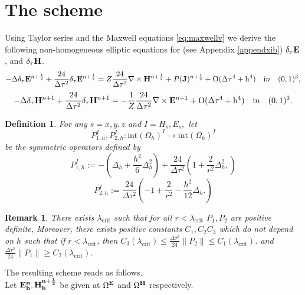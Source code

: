 \documentclass[12pt,reqno]{amsart}
\newcommand{\e}{{\bf E}}
\newcommand{\h}{{\bf H}}
\newcommand{\J}{{\bf J}}
\newtheorem{defi}[theorem]{Definition}
\newtheorem{rem}[theorem]{Remark}
\theoremstyle{definition}
\numberwithin{equation}{section}
\newcommand{\intr}[1]{\mathrm{int}(#1)}
\def\Gw{\Omega}     \def\Gx{\Xi}         \def\Gy{\Psi}
\def\Gwh{\Omega_h}
\begin{document}
	\section{The scheme}
	Using  Taylor series and the Maxwell equations \eqref{eq:maxwellv} we derive the following non-homogeneous elliptic equations for (see Appendix \ref{appendxib})
$	\delta_{\tau} \bf{E}$, and $\delta_{\tau} \bf{H}$.
	$$
	-\Delta\delta_{\tau} \e^{n+\frac{1}{2}}+\frac{24}{\Delta \tau^2}\delta_{\tau}\e^{n+\frac{1}{2}}=
	Z\frac{24}{\Delta \tau^2}\nabla\times \h^{n+\frac{1}{2}}+P(\J)^{n+\frac{1}{2}}+
	\mathrm{O(\Delta \tau^4+h^4)} \quad {\mathrm in} \quad (0,1)^3,
	$$
		$$
	-\Delta \delta_{\tau}\h^{n+1}+\frac{24}{\Delta \tau^2}\delta_{\tau}\h^{n+1}=
	-\frac{1}{Z}\frac{24}{\Delta \tau^2}\nabla\times \e^{n+1}+
	\mathrm{O(\Delta \tau^4+h^4)} \quad {\mathrm in} \quad (0,1)^3.
	$$
	\begin{defi}
		For any $s=x,y,z$ and $I= H_s, E_s,$
		let $$P_{1,h}^{I}, P_{2,h}^{I}:\intr\Gwh^{I}\to \intr\Gwh^{I}$$ be the symmetric operators defined by
		$$
		P_{1,h}^{I}:=-\left (\Delta_h+\frac{h^2}{6}\Delta_h^2\right)+\frac{24}{\Delta \tau^2}\left (
		 1+\frac{2}{r^2}\Delta_h^2,
		\right)
		$$
		$$
			P_{2,h}^{I}:=\frac{24}{\Delta \tau^2}\left (
		-1+\frac{2}{r^2}-\frac{h^2}{12}\Delta_h.
		\right)
		$$	
		
		
	\end{defi}
\begin{rem}\label{lem:bottom_spectrum}
	There exists $\lambda_{\mathrm{crit}}$ such that for all $r<\lambda_{\mathrm{crit}}$
 $P_1,P_{2}$ are positive definite, 
Moreover, there exists positive  constants $C_1,C_2 C_3$ which do not depend on $h$ such that
if $r<\lambda_{\mathrm{crit}}$, then
$C_3(\lambda_{\mathrm{crit}})\leq \frac{\Delta \tau^2 }{24}\|P_2\|\leq C_1(\lambda_{\mathrm{crit}})$.
and 
$\frac{\Delta \tau^2 }{24}\|P_1\|\geq C_2(\lambda_{\mathrm{crit}})$.
\end{rem}
	The resulting scheme reads as follows.\\[1mm]
	Let $\bf{E}^n_h, \bf{H}^{n+\frac{1}{2}}_h$  be given at $\Gw^{\e}$ and $\Gw^{\h}$ respectively. \\[2mm]
\end{document}
